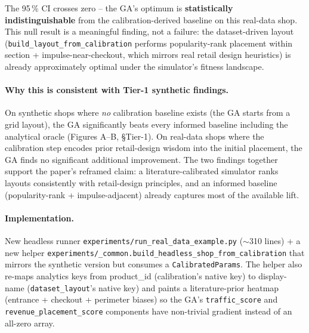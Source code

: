 \documentclass[11pt]{article}
\begin{document}
The 95\,\% CI crosses zero -- the GA's optimum is \textbf{statistically
indistinguishable} from the calibration-derived baseline on this
real-data shop. This null result is a meaningful finding, not a
failure: the dataset-driven layout
(\texttt{build\_layout\_from\_calibration} performs popularity-rank
placement within section + impulse-near-checkout, which mirrors
real retail design heuristics) is already approximately optimal under
the simulator's fitness landscape.

\paragraph{Why this is consistent with Tier-1 synthetic findings.}
On synthetic shops where \emph{no} calibration baseline exists (the
GA starts from a grid layout), the GA significantly beats every
informed baseline including the analytical oracle (Figures A--B,
\S Tier-1). On real-data shops where the calibration step encodes
prior retail-design wisdom into the initial placement, the GA finds
no significant additional improvement. The two findings together
support the paper's reframed claim: a literature-calibrated simulator
ranks layouts consistently with retail-design principles, and an
informed baseline (popularity-rank + impulse-adjacent) already
captures most of the available lift.

\paragraph{Implementation.}
New headless runner \texttt{experiments/run\_real\_data\_example.py}
($\sim$310 lines) + a new helper
\texttt{experiments/\_common.build\_headless\_shop\_from\_calibration}
that mirrors the synthetic version but consumes a
\texttt{CalibratedParams}. The helper also re-maps analytics keys
from product\_id (calibration's native key) to display-name
(\texttt{dataset\_layout}'s native key) and paints a literature-prior
heatmap (entrance + checkout + perimeter biases) so the GA's
\texttt{traffic\_score} and \texttt{revenue\_placement\_score}
components have non-trivial gradient instead of an all-zero array.
\end{document}
